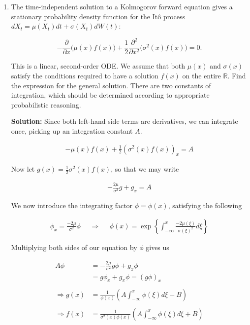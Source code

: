 \documentclass[12pt, a4paper]{article}
\begin{document}
\begin{enumerate}
\begin{enumerate}
    \end{enumerate}

    \item The time-independent solution to a Kolmogorov forward equation gives a stationary probability density function for the Itô process $dX_t = \mu (X_t)dt + \sigma(X_t)dW(t)$: 
    
    $$-\frac{\partial}{\partial x}\Big(\mu(x)f(x)\Big)+ \frac{1}{2}\frac{\partial^2}{\partial x^2}\Big(\sigma^2(x)f(x) \Big) = 0.$$

    This is a linear, second-order ODE. We assume that both $\mu(x)$ and $\sigma(x)$ satisfy the conditions required to have a solution $f(x)$ on the entire $\mathbb R$. Find the expression for the general solution. There are two constants of integration, which should be determined according to appropriate probabilistic reasoning.

    \textbf{Solution:} Since both left-hand side terms are derivatives, we can integrate once, picking up an integration constant $A$. 

    \begin{align*}
        -\mu(x) f(x) + \frac{1}{2}(\sigma^2(x)f(x))_x = A
    \end{align*}
    
    Now let $g(x) = \frac{1}{2} \sigma^2(x) f(x)$, so that we may write 

    \begin{align*}
        -\frac{2\mu}{\sigma^2}g + g_x = A
    \end{align*}

    We now introduce the integrating factor $\phi = \phi(x)$, satisfying the following

    \begin{align*}
        \phi_x = \frac{-2\mu}{\sigma^2} \phi && \Rightarrow && \phi(x) = \exp \left\{ \int_{-\infty}^x \frac{-2\mu(\xi)}{\sigma(\xi)^2}d\xi \right\}
    \end{align*}

    Multiplying both sides of our equation by $\phi$ gives us

    \begin{align*}
        A \phi &= -\frac{2\mu}{\sigma^2} g\phi + g_x \phi \\
        &= g \phi_x + g_x \phi = (g\phi)_x\\\\
        \Rightarrow g(x) &= \frac{1}{\phi(x)} \left( A \int_{-\infty}^x \phi(\xi) d\xi +B \right) \\\\
        \Rightarrow f(x) &= \frac{1}{\sigma^2(x)\phi(x)} \left( A \int_{-\infty}^x \phi(\xi) d\xi +B \right)
    \end{align*}


\end{enumerate}
\end{document}
